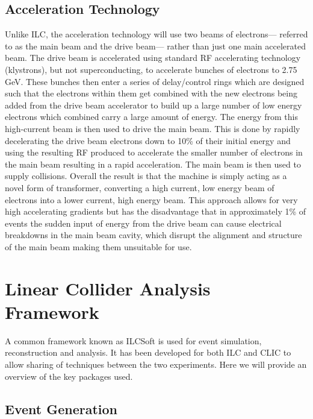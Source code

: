 \subsection{Acceleration Technology}
\label{sect:clicaccelerator}
Unlike \ac{ILC}, the acceleration technology will use two beams of electrons--- referred to as the main beam and the drive beam--- rather than just one main accelerated beam. The drive beam is accelerated using standard \ac{RF} accelerating technology (klystrons), but not superconducting, to accelerate bunches of electrons to 2.75 GeV. These bunches then enter a series of delay/control rings which are designed such that the electrons within them get combined with the new electrons being added from the drive beam accelerator to build up a large number of low energy electrons which combined carry a large amount of energy. The energy from this high-current beam is then used to drive the main beam. This is done by rapidly decelerating the drive beam electrons down to 10\% of their initial energy and using the resulting \ac{RF} produced to accelerate the smaller number of electrons in the main beam resulting in a rapid acceleration. The main beam is then used to supply collisions. Overall the result is that the machine is simply acting as a novel form of transformer, converting a high current, low energy beam of electrons into a lower current, high energy beam. This approach allows for very high accelerating gradients but has the disadvantage that in approximately 1\% of events the sudden input of energy from the drive beam can cause electrical breakdowns in the main beam cavity, which disrupt the alignment and structure of the main beam making them unsuitable for use.

\section{Linear Collider Analysis Framework}

A common framework known as ILCSoft is used for event simulation, reconstruction and analysis. It has been developed for both \ac{ILC} and \ac{CLIC} to allow sharing of techniques between the two experiments. Here we will provide an overview of the key packages used.

\subsection{Event Generation}

